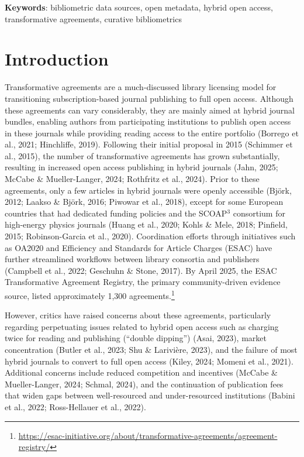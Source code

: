 \documentclass[a4paper,man,floatsintext,longtable,noextraspace,10pt]{apa6}
\begin{document}
{\textbf{Keywords}: bibliometric data sources, open metadata, hybrid open access, transformative agreements, curative bibliometrics}

\newpage

\setcounter{secnumdepth}{2}

\section{Introduction}\label{introduction}

Transformative agreements are a much-discussed library licensing model
for transitioning subscription-based journal publishing to full open
access. Although these agreements can vary considerably, they are mainly
aimed at hybrid journal bundles, enabling authors from participating
institutions to publish open access in these journals while providing
reading access to the entire portfolio (Borrego et al., 2021;
Hinchliffe, 2019). Following their initial proposal in 2015 (Schimmer et
al., 2015), the number of transformative agreements has grown
substantially, resulting in increased open access publishing in hybrid
journals (Jahn, 2025; McCabe \& Mueller-Langer, 2024; Rothfritz et al.,
2024). Prior to these agreements, only a few articles in hybrid journals
were openly accessible (Björk, 2012; Laakso \& Björk, 2016; Piwowar et
al., 2018), except for some European countries that had dedicated
funding policies and the SCOAP\(^3\) consortium for high-energy physics
journals (Huang et al., 2020; Kohls \& Mele, 2018; Pinfield, 2015;
Robinson-Garcia et al., 2020). Coordination efforts through initiatives
such as OA2020 and Efficiency and Standards for Article Charges (ESAC)
have further streamlined workflows between library consortia and
publishers (Campbell et al., 2022; Geschuhn \& Stone, 2017). By April
2025, the ESAC Transformative Agreement Registry, the primary
community-driven evidence source, listed approximately 1,300
agreements.\footnote{\url{https://esac-initiative.org/about/transformative-agreements/agreement-registry/}}

However, critics have raised concerns about these agreements,
particularly regarding perpetuating issues related to hybrid open access
such as charging twice for reading and publishing (``double dipping'')
(Asai, 2023), market concentration (Butler et al., 2023; Shu \&
Larivière, 2023), and the failure of most hybrid journals to convert to
full open access (Kiley, 2024; Momeni et al., 2021). Additional concerns
include reduced competition and incentives (McCabe \& Mueller-Langer,
2024; Schmal, 2024), and the continuation of publication fees that widen
gaps between well-resourced and under-resourced institutions (Babini et
al., 2022; Ross-Hellauer et al., 2022).
\end{document}
